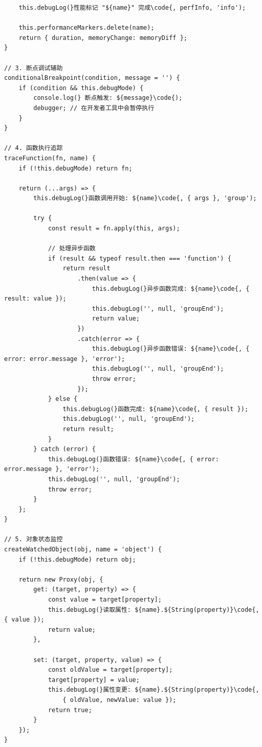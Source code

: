 \begin{verbatim}
    this.debugLog(}性能标记 "${name}" 完成\code{, perfInfo, 'info');
    
    this.performanceMarkers.delete(name);
    return { duration, memoryChange: memoryDiff };
}

// 3. 断点调试辅助
conditionalBreakpoint(condition, message = '') {
    if (condition && this.debugMode) {
        console.log(} 断点触发: ${message}\code{);
        debugger; // 在开发者工具中会暂停执行
    }
}

// 4. 函数执行追踪
traceFunction(fn, name) {
    if (!this.debugMode) return fn;
    
    return (...args) => {
        this.debugLog(}函数调用开始: ${name}\code{, { args }, 'group');
        
        try {
            const result = fn.apply(this, args);
            
            // 处理异步函数
            if (result && typeof result.then === 'function') {
                return result
                    .then(value => {
                        this.debugLog(}异步函数完成: ${name}\code{, { result: value });
                        this.debugLog('', null, 'groupEnd');
                        return value;
                    })
                    .catch(error => {
                        this.debugLog(}异步函数错误: ${name}\code{, { error: error.message }, 'error');
                        this.debugLog('', null, 'groupEnd');
                        throw error;
                    });
            } else {
                this.debugLog(}函数完成: ${name}\code{, { result });
                this.debugLog('', null, 'groupEnd');
                return result;
            }
        } catch (error) {
            this.debugLog(}函数错误: ${name}\code{, { error: error.message }, 'error');
            this.debugLog('', null, 'groupEnd');
            throw error;
        }
    };
}

// 5. 对象状态监控
createWatchedObject(obj, name = 'object') {
    if (!this.debugMode) return obj;
    
    return new Proxy(obj, {
        get: (target, property) => {
            const value = target[property];
            this.debugLog(}读取属性: ${name}.${String(property)}\code{, { value });
            return value;
        },
        
        set: (target, property, value) => {
            const oldValue = target[property];
            target[property] = value;
            this.debugLog(}属性变更: ${name}.${String(property)}\code{, 
                { oldValue, newValue: value });
            return true;
        }
    });
}


\end{verbatim}

